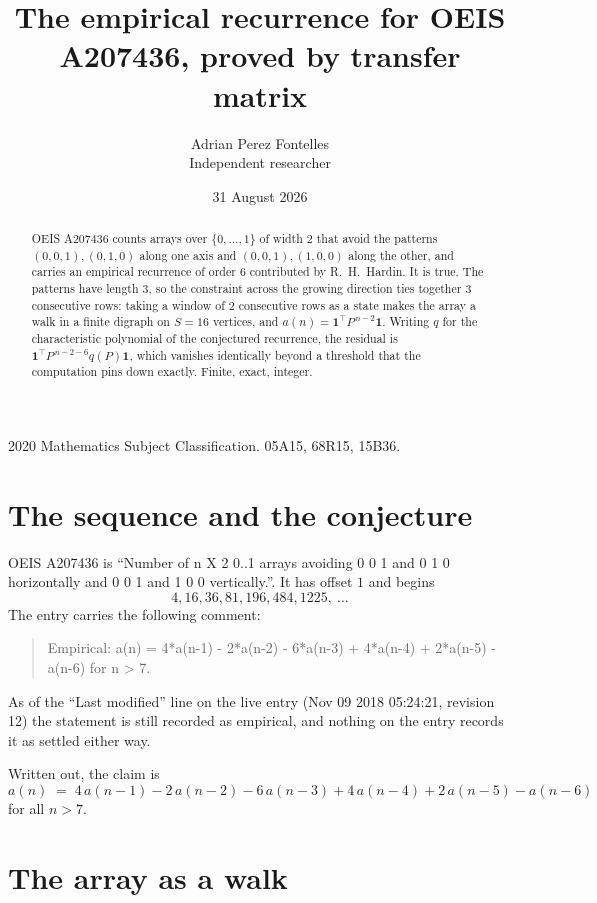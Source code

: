 \documentclass[11pt,a4paper]{article}
\title{The empirical recurrence for OEIS A207436, proved by transfer matrix}
\author{Adrian Perez Fontelles\\ \small Independent researcher}
\date{31 August 2026}
\theoremstyle{plain}
\theoremstyle{definition}
\begin{document}
\maketitle

\begin{abstract}
OEIS A207436 counts arrays over $\{0,\dots,1\}$ of width $2$ that avoid the patterns
$(0,0,1), (0,1,0)$ along one axis and $(0,0,1), (1,0,0)$ along the other, and carries an empirical recurrence of
order $6$ contributed by R.~H.~Hardin. It is true. The patterns have length $3$, so
the constraint across the growing direction ties together $3$ consecutive rows: taking a
window of $2$ consecutive rows as a state makes the array a walk in a finite digraph
on $S=16$ vertices, and $a(n)=\mathbf{1}^{\!\top}P^{\,n-2}\mathbf{1}$. Writing $q$
for the characteristic polynomial of the conjectured recurrence, the residual is
$\mathbf{1}^{\!\top}P^{\,n-2-6}q(P)\mathbf{1}$, which vanishes identically
beyond a threshold that the computation pins down exactly. Finite, exact, integer.
\end{abstract}

\noindent\small 2020 Mathematics Subject Classification. 05A15, 68R15, 15B36.\normalsize

\section{The sequence and the conjecture}

OEIS A207436 is ``Number of n X 2 0..1 arrays avoiding 0 0 1 and 0 1 0 horizontally and 0 0 1 and 1 0 0 vertically.''. It has offset
$1$ and begins
\[
4, 16, 36, 81, 196, 484, 1225,\ \dots
\]
The entry carries the following comment:
\begin{quote}\small
Empirical: a(n) = 4*a(n-1) - 2*a(n-2) - 6*a(n-3) + 4*a(n-4) + 2*a(n-5) - a(n-6) for n > 7.
\end{quote}
As of the ``Last modified'' line on the live entry (Nov 09 2018 05:24:21, revision
12) the statement is still recorded as empirical, and nothing on the entry
records it as settled either way.

Written out, the claim is
\begin{equation}\label{eq:conj}
a(n)\;=\;4\,a(n-1) - 2\,a(n-2) - 6\,a(n-3) + 4\,a(n-4) + 2\,a(n-5) - a(n-6)
\end{equation}
for all $n>7$. 

\section{The array as a walk}
\end{document}
